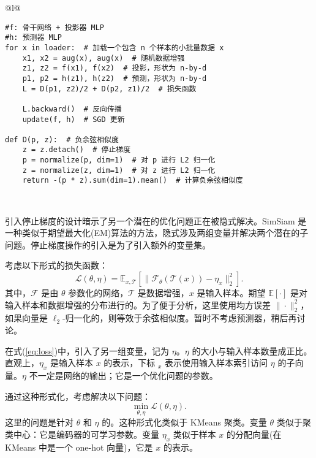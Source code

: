 \documentclass[master]{thesis-uestc}
\begin{document}
\begin{table}
    \caption{简单暹罗孪生网络的伪代码，用Pytorch描述}
    \begin{tabular}{@{}l@{}} %
    \toprule
     \\ %
    \midrule
    \begin{lstlisting}[basicstyle=\ttfamily,frame=none]
#f: 骨干网络 + 投影器 MLP
#h: 预测器 MLP
for x in loader:  # 加载一个包含 n 个样本的小批量数据 x
    x1, x2 = aug(x), aug(x)  # 随机数据增强
    z1, z2 = f(x1), f(x2)  # 投影，形状为 n-by-d
    p1, p2 = h(z1), h(z2)  # 预测，形状为 n-by-d
    L = D(p1, z2)/2 + D(p2, z1)/2  # 损失函数

    L.backward()  # 反向传播
    update(f, h)  # SGD 更新

def D(p, z):  # 负余弦相似度
    z = z.detach()  # 停止梯度
    p = normalize(p, dim=1)  # 对 p 进行 L2 归一化
    z = normalize(z, dim=1)  # 对 z 进行 L2 归一化
    return -(p * z).sum(dim=1).mean()  # 计算负余弦相似度
    \end{lstlisting} \\
    \bottomrule
    \end{tabular}
    \label{table:simsiam_code}
\end{table}
引入停止梯度的设计暗示了另一个潜在的优化问题正在被隐式解决。SimSiam 是一种类似于期望最大化(EM)算法的方法，隐式涉及两组变量并解决两个潜在的子问题。停止梯度操作的引入是为了引入额外的变量集。

考虑以下形式的损失函数：
\begin{equation}
\label{eq:loss}
\mathcal{L}(\theta,\eta)=\mathbb{E}_{x,\mathcal{T}}\left[\|\mathcal{F}_{\theta} (\mathcal{T}(x))-\eta_{x}\|^{2}_{2}\right].
\end{equation}
其中，$\mathcal{F}$ 是由 $\theta$ 参数化的网络，$\mathcal{T}$ 是数据增强，$x$ 是输入样本。期望 $\mathbb{E}[\cdot]$ 是对输入样本和数据增强的分布进行的。为了便于分析，这里使用均方误差 $\|\cdot\|^{2}_{2}$，如果向量是 $\ell_{2}$-归一化的，则等效于余弦相似度。暂时不考虑预测器，稍后再讨论。

在式(\ref{eq:loss})中，引入了另一组变量，记为 $\eta$。$\eta$ 的大小与输入样本数量成正比。直观上，$\eta_{x}$ 是输入样本 $x$ 的表示，下标 ${}_{x}$ 表示使用输入样本索引访问 $\eta$ 的子向量。$\eta$ 不一定是网络的输出；它是一个优化问题的参数。

通过这种形式化，考虑解决以下问题：
\begin{equation}
\label{eq:min_loss}
\min_{\theta,\eta}\mathcal{L}(\theta,\eta).
\end{equation}
这里的问题是针对 $\theta$ 和 $\eta$ 的。这种形式化类似于 KMeans 聚类。变量 $\theta$ 类似于聚类中心：它是编码器的可学习参数。变量 $\eta_{x}$ 类似于样本 $x$ 的分配向量(在 KMeans 中是一个 one-hot 向量)，它是 $x$ 的表示。
\end{document}
